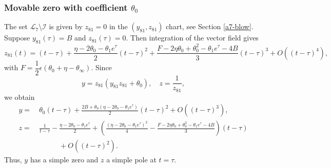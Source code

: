 \subsubsection*{Movable zero with coefficient $\theta_{0}$} The set $\mathcal{L}_7\setminus\mathcal{I}$ is given by $z_{81}=0$ in the $(y_{81},z_{81})$ chart, see Section \ref{a7-blow}.
Suppose $y_{81}(\tau)=B$ and $z_{81}(\tau)=0$.
Then integration of the vector field gives
\[
z_{81}(t)=(t-\tau)
+\frac{\eta-2\theta_0-\theta_1e^{\tau}}{2}(t-\tau)^2%
+\frac{F-2\eta\theta_0+\theta_0^2-\theta_1e^{\tau}-4B}{3}(t-\tau)^3
 +O((t-\tau)^4),
\]
with $F=\dfrac12\epsilon(\theta_0+\eta-\theta_{\infty})$.
Since
$$
y=z_{81}(y_{81}z_{81}+\theta_0),
\quad
z=\frac1{z_{81}},
$$
we obtain
\[
\begin{split}
y= &\ \theta_0(t-\tau)+\frac{2B+\theta_0(\eta-2\theta_0-\theta_1e^{\tau})}{2}(t-\tau)^2+O((t-\tau)^3),
\\
z=&\ \frac{1}{t-\tau}-\frac{\eta-2\theta_0-\theta_1e^{\tau}}{2}%
+\left(\frac{(\eta-2\theta_0-\theta_1e^{\tau})^2}{4}-\frac{F-2\eta\theta_0+\theta_0^2-\theta_1e^{\tau}-4B}{3}\right)(t-\tau)
\\&\qquad\quad
+O((t-\tau)^2).
\end{split}
\]
Thus, $y$ has a simple zero and $z$ a simple pole at $t=\tau$.

